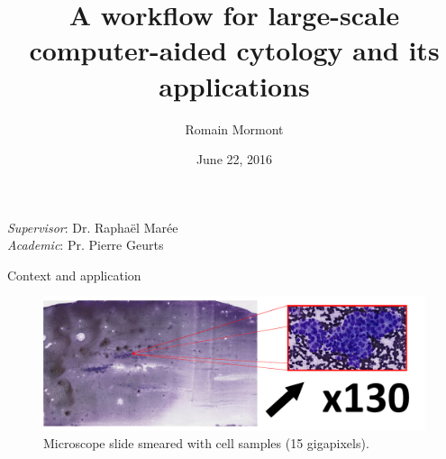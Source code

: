 \documentclass{beamer}
\title{{\bf A workflow for large-scale computer-aided cytology and its applications}}
\author{Romain Mormont}
\institute{Université de Liège, Belgium}
\date{June 22, 2016}
\begin{document}
\renewcommand{\inserttotalframenumber}{17}


\begin{frame}
\titlepage
\begin{center}
	\footnotesize
	\textit{Supervisor}: Dr. Raphaël Marée\\
	\textit{Academic}: Pr. Pierre Geurts
\end{center}
\end{frame}


\begin{frame}{Context and application}
	\vfill
	\begin{figure}[h]
	\center
	\includegraphics[scale=0.17]{images/whole-slide-dim.png}
	\caption{Microscope slide smeared with cell samples (15 gigapixels).}
	\end{figure}
	\vfill
\end{frame}
\end{document}
